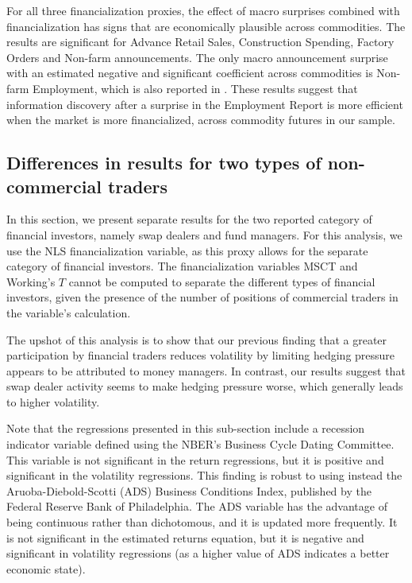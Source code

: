 \documentclass[12pt]{article}
\begin{document}
For all three financialization proxies, the effect of macro surprises combined with financialization has signs that are economically plausible across commodities. The results are significant for Advance Retail Sales, Construction Spending, Factory Orders and Non-farm announcements. The only macro announcement surprise with an estimated negative and significant coefficient across commodities is Non-farm Employment, which is also reported in \citet{hordahl2015expectations}. These results suggest that information discovery after a surprise in the Employment Report is more efficient when the market is more financialized, across commodity futures in our sample. 





\subsection{Differences in results for two types of non-commercial traders}


 In this section, we present separate results for the two reported category of financial investors, namely swap dealers and fund managers. For this analysis, we use the NLS financialization variable, as this proxy allows for the separate category of financial investors. The financialization variables MSCT and Working's $T$ cannot be computed to separate the different types of financial investors, given the presence of the number of positions of commercial traders in the variable’s calculation.

The upshot of this analysis is to show that our previous finding that a greater participation by financial traders reduces volatility by limiting hedging pressure appears to be attributed to money managers. In contrast, our results suggest that swap dealer activity seems to make hedging pressure worse, which generally leads to higher volatility.

 Note that the regressions presented in this sub-section include a recession indicator variable defined using the NBER's Business Cycle Dating Committee. This variable is not significant in the return regressions, but it is positive and significant in the volatility regressions. This finding is robust to using instead the Aruoba-Diebold-Scotti (ADS) Business Conditions Index, published by the Federal Reserve Bank of Philadelphia. The ADS variable has the advantage of being continuous rather than dichotomous, and it  is updated more frequently. It is not significant in the estimated returns equation, but it is negative and significant in volatility regressions (as a higher value of ADS indicates a better economic state).
\end{document}
